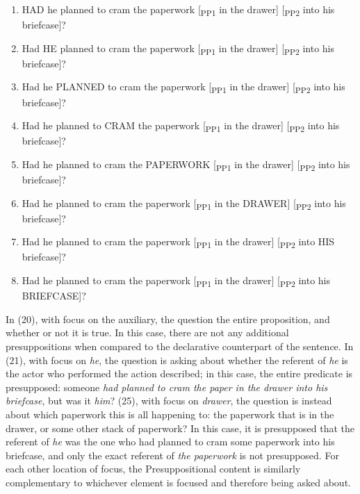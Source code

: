\documentclass[12pt,oneside]{book}
\providecommand{\tightlist}{%
  \setlength{\itemsep}{0pt}\setlength{\parskip}{0pt}}
\begin{document}
\singlespacing

\begin{enumerate}
\def\labelenumi{(\arabic{enumi})}
\setcounter{enumi}{19}
\tightlist
\item
  HAD he planned to cram the paperwork {[}\textsubscript{PP1} in the drawer{]} {[}\textsubscript{PP2} into his briefcase{]}?
\item
  Had HE planned to cram the paperwork {[}\textsubscript{PP1} in the drawer{]} {[}\textsubscript{PP2} into his briefcase{]}?
\item
  Had he PLANNED to cram the paperwork {[}\textsubscript{PP1} in the drawer{]} {[}\textsubscript{PP2} into his briefcase{]}?
\item
  Had he planned to CRAM the paperwork {[}\textsubscript{PP1} in the drawer{]} {[}\textsubscript{PP2} into his briefcase{]}?
\item
  Had he planned to cram the PAPERWORK {[}\textsubscript{PP1} in the drawer{]} {[}\textsubscript{PP2} into his briefcase{]}?
\item
  Had he planned to cram the paperwork {[}\textsubscript{PP1} in the DRAWER{]} {[}\textsubscript{PP2} into his briefcase{]}?
\item
  Had he planned to cram the paperwork {[}\textsubscript{PP1} in the drawer{]} {[}\textsubscript{PP2} into HIS briefcase{]}?
\item
  Had he planned to cram the paperwork {[}\textsubscript{PP1} in the drawer{]} {[}\textsubscript{PP2} into his BRIEFCASE{]}?
\end{enumerate}

\doublespacing

In (20), with focus on the auxiliary, the question  the entire proposition, and  whether or not it is true. In this case, there are not any additional presuppositions when compared to the declarative counterpart of the sentence. In (21), with focus on \emph{he}, the question is asking about whether the referent of \emph{he} is the actor who performed the action described; in this case, the entire predicate is presupposed: someone \emph{had planned to cram the paper in the drawer into his briefcase}, but was it \emph{him}?  (25), with focus on \emph{drawer}, the question is instead about which paperwork this is all happening to: the paperwork that is in the drawer, or some other stack of paperwork? In this case, it is presupposed that the referent of \emph{he} was the one who had planned to cram some paperwork into his briefcase, and only the exact referent of \emph{the paperwork} is not presupposed. For each other location of focus, the Presuppositional content is similarly complementary to whichever element is focused and therefore being asked about.
\end{document}
